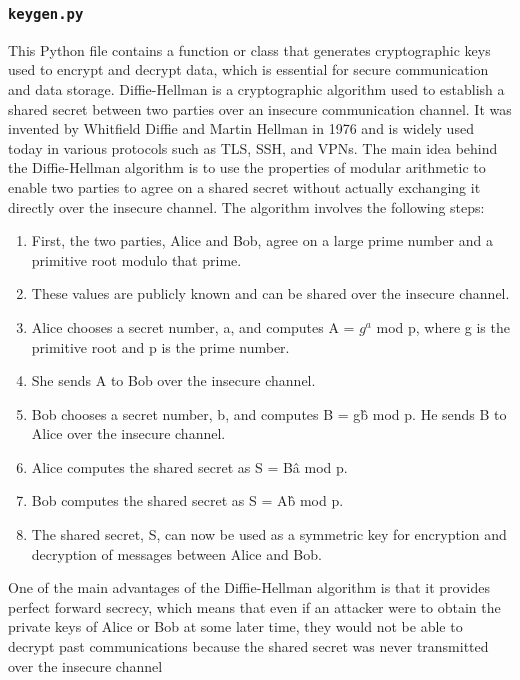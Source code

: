 \documentclass{article}
\begin{document}
\subsubsection{\texttt{keygen.py}} This Python file contains a function or class that generates cryptographic keys used to encrypt and decrypt data, which is essential for secure communication and data storage.
Diffie-Hellman is a cryptographic algorithm used to establish a shared secret between two parties over an insecure communication channel.
It was invented by Whitfield Diffie and Martin Hellman in 1976 and is widely used today in various protocols such as TLS, SSH, and VPNs.
The main idea behind the Diffie-Hellman algorithm is to use the properties of modular arithmetic to enable two parties to agree on a shared secret without actually exchanging it directly over the insecure channel.
The algorithm involves the following steps:
\begin{center}
    \begin{enumerate}
        \item First, the two parties, Alice and Bob, agree on a large prime number and a primitive root modulo that prime.
        \item These values are publicly known and can be shared over the insecure channel.
        \item Alice chooses a secret number, a, and computes A = $g^a$ mod p, where g is the primitive root and p is the prime number.
        \item She sends A to Bob over the insecure channel.
        \item Bob chooses a secret number, b, and computes B = g\^b mod p. He sends B to Alice over the insecure channel.
        \item Alice computes the shared secret as S = B\^a mod p.
        \item Bob computes the shared secret as S = A\^b mod p.
        \item The shared secret, S, can now be used as a symmetric key for encryption and decryption of messages between Alice and Bob.
    \end{enumerate}

\end{center}

One of the main advantages of the Diffie-Hellman algorithm is that it provides perfect forward secrecy, which means that even if an attacker were to obtain the private keys of Alice or Bob at some later time, they would not be able to decrypt past communications because the shared secret was never transmitted over the insecure channel
\end{document}
